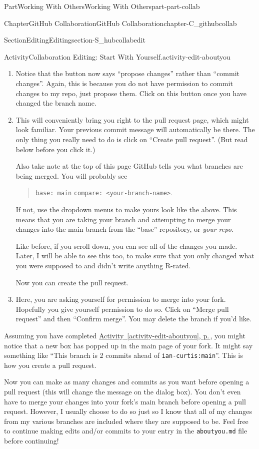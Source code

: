 \documentclass[twoside,10pt,]{book}
\newcommand{\xreffont}{\relax}
\newcommand{\mono}[1]{\texttt{#1}}
\begin{document}
\begin{partptx}{Part}{Working With Others}{}{Working With Others}{}{}{part-part-collab}
\begin{chapterptx}{Chapter}{GitHub Collaboration}{}{GitHub Collaboration}{}{}{chapter-C_githubcollab}
\begin{sectionptx}{Section}{Editing}{}{Editing}{}{}{section-S_hubcollabedit}
\begin{activity}{Activity}{Collaboration Editing: Start With Yourself.}{activity-edit-aboutyou}
\begin{enumerate}[font=\bfseries,label=(\alph*),ref=\alph*]
\par
Select the button that allows you to create a new branch and type in a better branch name.%
\item{}Notice that the button now says ``propose changes'' rather than ``commit changes''. Again, this is because you do not have permission to commit changes to my repo, just propose them. Click on this button once you have changed the branch name.%
\item{}This will conveniently bring you right to the pull request page, which might look familiar. Your previous commit message will automatically be there. The only thing you really need to do is click on ``Create pull request''. (But read below before you click it.)%
\par
Also take note at the top of this page GitHub tells you what branches are being merged. You will probably see%
\begin{quote}%
\mono{base: main} \faArrowLeft{} \mono{compare: <your-branch-name>}.%
\end{quote}
If not, use the dropdown menus to make yours look like the above. This means that you are taking your branch and attempting to merge your changes into the main branch from the ``base'' repository, or \emph{your repo}.%
\par
Like before, if you scroll down, you can see all of the changes you made. Later, I will be able to see this too, to make sure that you only changed what you were supposed to and didn't write anything R-rated.%
\par
Now you can create the pull request.%
\item{}Here, you are asking yourself for permission to merge into your fork. Hopefully you give yourself permission to do so. Click on ``Merge pull request'' and then ``Confirm merge''. You may delete the branch if you'd like.%
\end{enumerate}%
\end{activity}%
Assuming you have completed \hyperref[activity-edit-aboutyou]{Activity~{\xreffont\ref{activity-edit-aboutyou}}, p.\,\pageref{activity-edit-aboutyou}}, you might notice that a new box has popped up in the main page of your fork. It might say something like ``This branch is 2 commits ahead of \mono{ian-curtis:main}''. This is how you create a pull request.%
\par
Now you can make as many changes and commits as you want before opening a pull request (this will change the message on the dialog box). You don't even have to merge your changes into your fork's main branch before opening a pull request. However, I usually choose to do so just so I know that all of my changes from my various branches are included where they are supposed to be. Feel free to continue making edits and\slash{}or commits to your entry in the \mono{aboutyou.md} file before continuing!%

\end{sectionptx}
\end{chapterptx}
\end{partptx}
\end{document}
